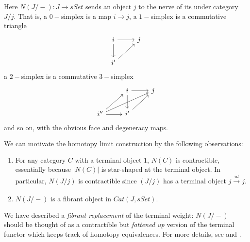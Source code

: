 Here $N(J/-):J\rightarrow sSet$ sends an object $j$ to the nerve of its under category $J/j$. That is, a $0-$simplex is a map $i\rightarrow j$, a $1-$simplex is a commutative triangle %
\[\begin{tikzcd}
i \arrow[r] \arrow[d] & j \\
i' \arrow[ru]         &  
\end{tikzcd}\] a $2-$simplex is a commutative $3-$simplex
\[\begin{tikzcd}
                                     & i \arrow[r] \arrow[d] & j \\
i'' \arrow[rru] \arrow[ru] \arrow[r] & i' \arrow[ru]         &  
\end{tikzcd}\]
and so on, with the obvious face and degeneracy maps. 

We can motivate the homotopy limit construction by the following observations:
\begin{enumerate}
    \item For any category $C$ with a terminal object $1$, $N(C)$ is contractible, essentially because $|N(C)|$ is star-shaped at the terminal object. In particular, $N(J/j)$ is contractible since $(J/j)$ has a terminal object $j\xrightarrow[]{id} j.$
    \item 
    $N(J/-)$ is a fibrant object in $Cat(J,sSet)$.
\end{enumerate}
We have described a \textit{fibrant replacement} of the terminal weight: $N(J/-)$ should be thought of as a contractible but \textit{fattened up} version of the terminal functor which keeps track of homotopy equivalences. For more details, see \cite{Loregian21} and \cite{Riehl14}.


